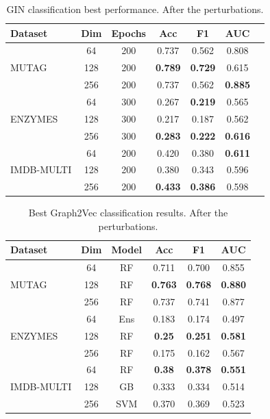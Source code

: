 \begin{table}
\centering
\begin{tabular}{l c c c c c c}
\hline
\textbf{Dataset} & \textbf{Dim} & \textbf{Epochs} & \textbf{Acc} & \textbf{F1} & \textbf{AUC} \\
\hline
     & 64  & 200 & 0.737 & 0.562 & 0.808 \\
MUTAG      & 128 & 200 & \textbf{0.789} & \textbf{0.729} & 0.615 \\
      & 256 & 200 & 0.737 & 0.562 & \textbf{0.885} \\
\hline
    & 64  & 300& 0.267 & \textbf{0.219} & 0.565 \\
ENZYMES    & 128 & 300  & 0.217 & 0.187 & 0.562 \\
  & 256 & 300 & \textbf{0.283} & \textbf{0.222} & \textbf{0.616} \\
\hline
 & 64  & 200  & 0.420 & 0.380 & \textbf{0.611} \\
IMDB-MULTI & 128 & 200  & 0.380 & 0.343 & 0.596 \\
 & 256 & 200  & \textbf{0.433} & \textbf{0.386} & 0.598 \\
\hline
\end{tabular}
\caption{GIN classification best performance. After the perturbations.}
\label{tab:gin_best_per}
\end{table}


\begin{table}
\centering
\begin{tabular}{l c c c c c}
\hline
\textbf{Dataset} & \textbf{Dim} & \textbf{Model} & \textbf{Acc} & \textbf{F1} & \textbf{AUC} \\
\hline
      & 64  & RF  & 0.711 & 0.700 & 0.855 \\
MUTAG      & 128 & RF  & \textbf{0.763} & \textbf{0.768} & \textbf{0.880} \\
     & 256 & RF  & 0.737 & 0.741 & 0.877 \\
\hline
    & 64  & Ens & 0.183 & 0.174 & 0.497 \\
ENZYMES    & 128 & RF  & \textbf{0.25} & \textbf{0.251} & \textbf{0.581} \\
   & 256 & RF  & 0.175 & 0.162 & 0.567 \\
\hline
 & 64  & RF  & \textbf{0.38} & \textbf{0.378} & \textbf{0.551} \\
IMDB-MULTI & 128 & GB  & 0.333 & 0.334 & 0.514 \\
 & 256 & SVM & 0.370 & 0.369 & 0.523 \\
\hline
\end{tabular}
\caption{Best Graph2Vec classification results. 
After the perturbations.}
\label{tab:graph2vec_best_per}
\end{table}



